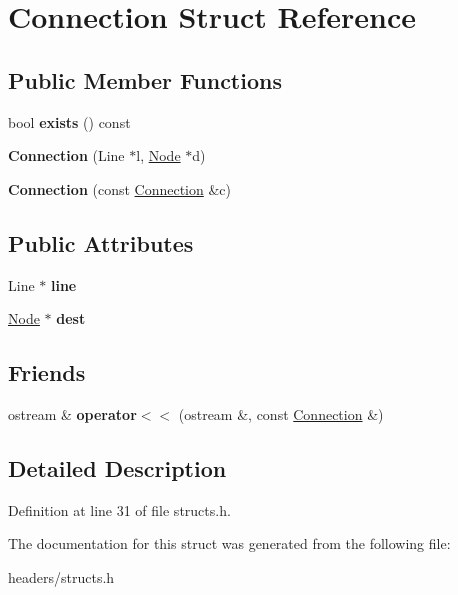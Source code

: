 \hypertarget{structConnection}{\section{Connection Struct Reference}
\label{structConnection}
}
\subsection*{Public Member Functions}
\begin{DoxyCompactItemize}
\item 
\hypertarget{structConnection_a5d69f2efa52f09b449af20c9479d67f8}{bool {\bfseries exists} () const }\label{structConnection_a5d69f2efa52f09b449af20c9479d67f8}

\item 
\hypertarget{structConnection_aaeb38386d09fdcd4d9eb70f58a31a8ed}{{\bfseries Connection} (Line $\ast$l, \hyperlink{structNode}{Node} $\ast$d)}\label{structConnection_aaeb38386d09fdcd4d9eb70f58a31a8ed}

\item 
\hypertarget{structConnection_aa865a13af12c712d04723871157205ae}{{\bfseries Connection} (const \hyperlink{structConnection}{Connection} \&c)}\label{structConnection_aa865a13af12c712d04723871157205ae}

\end{DoxyCompactItemize}
\subsection*{Public Attributes}
\begin{DoxyCompactItemize}
\item 
\hypertarget{structConnection_ac58f77f98bae33bc33702f909aa08535}{Line $\ast$ {\bfseries line}}\label{structConnection_ac58f77f98bae33bc33702f909aa08535}

\item 
\hypertarget{structConnection_a76ec6b5abe73168d8cad263d745524b3}{\hyperlink{structNode}{Node} $\ast$ {\bfseries dest}}\label{structConnection_a76ec6b5abe73168d8cad263d745524b3}

\end{DoxyCompactItemize}
\subsection*{Friends}
\begin{DoxyCompactItemize}
\item 
\hypertarget{structConnection_a43649da031123d524f6605d2b0b4ebc8}{ostream \& {\bfseries operator$<$$<$} (ostream \&, const \hyperlink{structConnection}{Connection} \&)}\label{structConnection_a43649da031123d524f6605d2b0b4ebc8}

\end{DoxyCompactItemize}


\subsection{Detailed Description}


Definition at line 31 of file structs.\+h.



The documentation for this struct was generated from the following file\+:\begin{DoxyCompactItemize}
\item 
headers/structs.\+h\end{DoxyCompactItemize}
